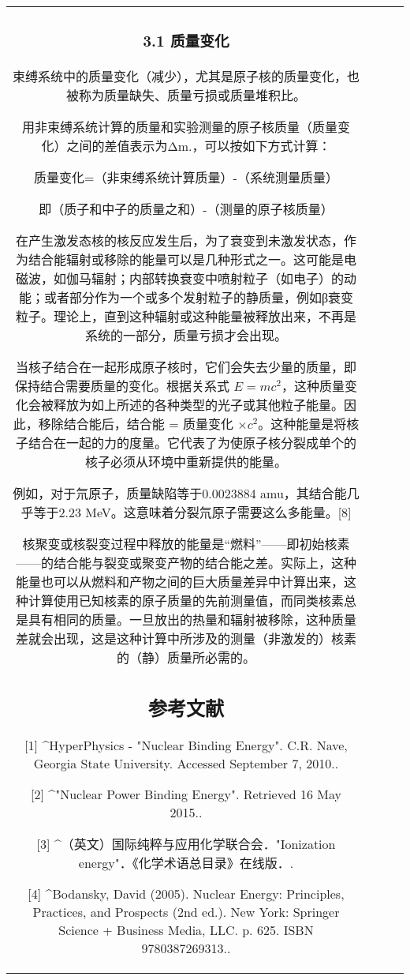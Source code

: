 \begin{table}[ht]
\begin{tabular}{|c|c|c|c}
\subsubsection{3.1 质量变化}
束缚系统中的质量变化（减少），尤其是原子核的质量变化，也被称为质量缺失、质量亏损或质量堆积比。

用非束缚系统计算的质量和实验测量的原子核质量（质量变化）之间的差值表示为Δm.，可以按如下方式计算：

质量变化=（非束缚系统计算质量）-（系统测量质量）

即（质子和中子的质量之和）-（测量的原子核质量）

在产生激发态核的核反应发生后，为了衰变到未激发状态，作为结合能辐射或移除的能量可以是几种形式之一。这可能是电磁波，如伽马辐射；内部转换衰变中喷射粒子（如电子）的动能；或者部分作为一个或多个发射粒子的静质量，例如β衰变粒子。理论上，直到这种辐射或这种能量被释放出来，不再是系统的一部分，质量亏损才会出现。

当核子结合在一起形成原子核时，它们会失去少量的质量，即保持结合需要质量的变化。根据关系式 $E = mc^2$，这种质量变化会被释放为如上所述的各种类型的光子或其他粒子能量。因此，移除结合能后，结合能 = 质量变化 $\times c^2$。这种能量是将核子结合在一起的力的度量。它代表了为使原子核分裂成单个的核子必须从环境中重新提供的能量。

例如，对于氘原子，质量缺陷等于0.0023884 amu，其结合能几乎等于2.23 MeV。这意味着分裂氘原子需要这么多能量。[8]

核聚变或核裂变过程中释放的能量是“燃料”——即初始核素——的结合能与裂变或聚变产物的结合能之差。实际上，这种能量也可以从燃料和产物之间的巨大质量差异中计算出来，这种计算使用已知核素的原子质量的先前测量值，而同类核素总是具有相同的质量。一旦放出的热量和辐射被移除，这种质量差就会出现，这是这种计算中所涉及的测量（非激发的）核素的（静）质量所必需的。

\subsection{参考文献}
[1]
^HyperPhysics - "Nuclear Binding Energy". C.R. Nave, Georgia State University. Accessed September 7, 2010..

[2]
^"Nuclear Power Binding Energy". Retrieved 16 May 2015..

[3]
^（英文）国际纯粹与应用化学联合会．"Ionization energy"．《化学术语总目录》在线版．.

[4]
^Bodansky, David (2005). Nuclear Energy: Principles, Practices, and Prospects (2nd ed.). New York: Springer Science + Business Media, LLC. p. 625. ISBN 9780387269313..


\end{tabular}
\end{table}
